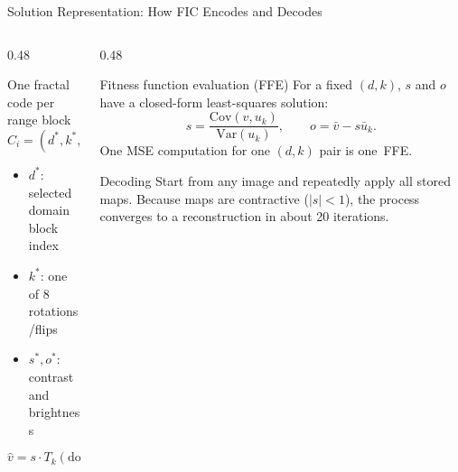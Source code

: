 \documentclass[10pt,aspectratio=169]{beamer}
\begin{document}
\begin{frame}{Solution Representation: How FIC Encodes and Decodes}
  \begin{columns}[T,onlytextwidth]
    \begin{column}{0.48\textwidth}
      \begin{block}{One fractal code per range block}
        \[
          C_i=(d^*, k^*, s^*, o^*)
        \]
        \begin{itemize}
          \item $d^*$: selected domain block index
          \item $k^*$: one of 8 rotations/flips
          \item $s^*, o^*$: contrast and brightness
        \end{itemize}
      \end{block}
      \[
        \hat v = s\cdot T_k(\text{downsample}(u_d)) + o
      \]
    \end{column}
    \hfill
    \begin{column}{0.48\textwidth}
      \begin{block}{Fitness function evaluation (FFE)}
        For a fixed $(d,k)$, $s$ and $o$ have a closed-form least-squares solution:
        \[
          s=\frac{\mathrm{Cov}(v,u_k)}{\mathrm{Var}(u_k)},\qquad
          o=\bar v-s\bar u_k.
        \]
        One MSE computation for one $(d,k)$ pair is one~\alert{FFE}.
      \end{block}
      \begin{exampleblock}{Decoding}
        Start from any image and repeatedly apply all stored maps. Because maps are
        contractive ($|s|<1$), the process converges to a reconstruction in about
        20 iterations.
      \end{exampleblock}
    \end{column}
  \end{columns}
\end{frame}
\end{document}
